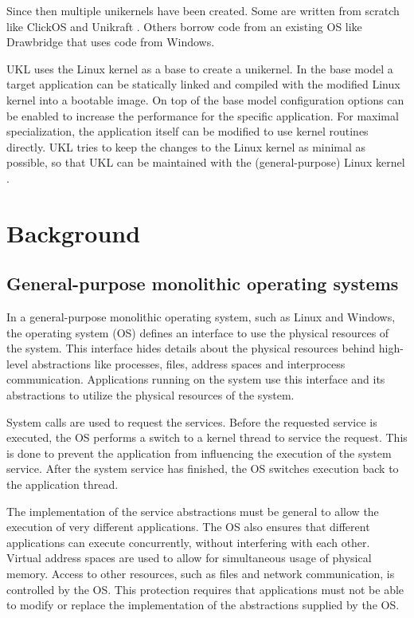 \documentclass[10pt,twocolumn,a4paper]{article}
\begin{document}
  Since then multiple unikernels have been created. Some are written from scratch like
  ClickOS \cite{martins2014} and Unikraft \cite{kuenzer21}.
  Others borrow code from an existing OS like Drawbridge \cite{porter11} 
  that uses code from Windows.

  UKL uses the Linux kernel as a base to create a unikernel.
  In the base model a target application can be statically linked and compiled with
  the modified Linux kernel into a bootable image.
  On top of the base model configuration options can be enabled to increase the performance
  for the specific application.
  For maximal specialization, the application itself can be modified to use kernel routines
  directly.
  UKL tries to keep the changes to the Linux kernel as minimal as possible,
  so that UKL can be maintained with the (general-purpose) Linux kernel \cite{raza23}.
  

\section{Background}\label{sec:background}
  \subsection{General-purpose monolithic operating systems}
    In a general-purpose monolithic operating system, such as Linux and Windows,
    the operating system (OS) defines an interface to use the physical resources
    of the system. 
    This interface hides details about the physical resources behind
    high-level abstractions like processes, files, address spaces 
    and interprocess communication.
    Applications running on the system use this interface and its abstractions
    to utilize the physical resources of the system.

    System calls are used to request the services.
    Before the requested service is executed, the OS performs a switch to a kernel thread
    to service the request.
    This is done to prevent the application from influencing the execution of the system service.
    After the system service has finished, the OS switches execution back to the application thread.

    The implementation of the service abstractions must be general to allow the execution 
    of very different applications.
    The OS also ensures that different applications can execute concurrently, 
    without interfering with each other. 
    Virtual address spaces are used to allow for simultaneous usage of physical memory.
    Access to other resources, such as files and network communication, is controlled
    by the OS.
    This protection requires that applications must not be able
    to modify or replace the implementation of the abstractions supplied by the OS.
\end{document}
